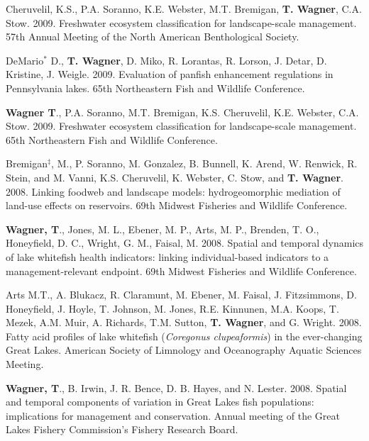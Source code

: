 \documentclass[10pt]{article}
\begin{document}
\begin{flushleft}
\begin{etaremune}
\item Cheruvelil, K.S., P.A. Soranno, K.E. Webster, M.T. Bremigan, {\bf T. Wagner}, C.A. Stow. 2009. Freshwater ecosystem classification for landscape-scale management. 57th Annual Meeting of the North American Benthological Society. 

\item DeMario$^*$ D., {\bf T. Wagner}, D. Miko, R. Lorantas, R. Lorson, J. Detar, D. Kristine, J. Weigle. 2009. Evaluation of panfish enhancement regulations in Pennsylvania lakes. 65th Northeastern Fish and Wildlife Conference.

\item {\bf Wagner T}., P.A. Soranno, M.T. Bremigan, K.S. Cheruvelil, K.E. Webster, C.A. Stow. 2009. Freshwater ecosystem classification for landscape-scale management. 65th Northeastern Fish and Wildlife Conference.


\item Bremigan$^\ddagger$, M., P. Soranno, M. Gonzalez,  B. Bunnell, K. Arend, W. Renwick, R. Stein, and M. Vanni, K.S. Cheruvelil, K. Webster, C. Stow, and {\bf T. Wagner}. 2008. Linking foodweb and landscape models: hydrogeomorphic mediation of land-use effects on reservoirs. 69th Midwest Fisheries and Wildlife Conference.

\item {\bf Wagner, T}., Jones, M. L., Ebener, M. P., Arts, M. P., Brenden, T. O., Honeyfield, D. C., Wright, G. M., Faisal, M. 2008. Spatial and temporal dynamics of lake whitefish health indicators: linking individual-based indicators to a management-relevant endpoint. 69th Midwest Fisheries and Wildlife Conference.

\item Arts M.T., A. Blukacz, R. Claramunt, M. Ebener, M. Faisal, J. Fitzsimmons, D. Honeyfield, J. Hoyle, T. Johnson, M. Jones, R.E. Kinnunen, M.A. Koops, T. Mezek, A.M. Muir, A. Richards, T.M. Sutton, {\bf T. Wagner}, and G. Wright. 2008. Fatty acid profiles of lake whitefish (\emph{Coregonus clupeaformis}) in the ever-changing Great Lakes. American Society of Limnology and Oceanography Aquatic Sciences Meeting.

\item {\bf Wagner, T}., B. Irwin, J. R. Bence, D. B. Hayes, and N. Lester. 2008. Spatial and temporal components of variation in Great Lakes fish populations: implications for management and conservation.  Annual meeting of the Great Lakes Fishery Commission’s Fishery Research Board.



\end{etaremune}
\end{flushleft}
\end{document}
